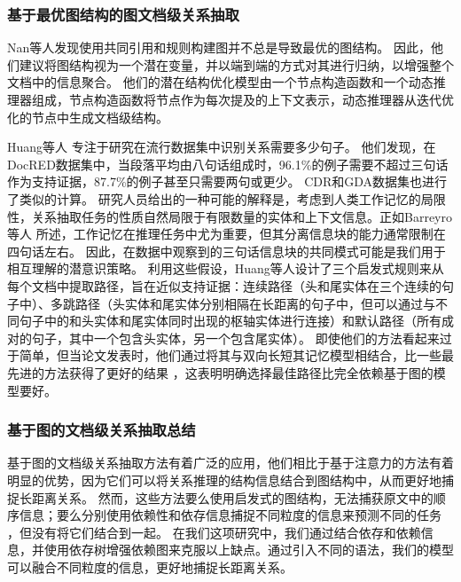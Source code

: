 \documentclass[bachelor]{thesis-uestc}
\begin{document}
\subsubsection{基于最优图结构的图文档级关系抽取}\label{subsec:optimal-graph}

Nan等人\cite{nan-etal-2020-reasoning}发现使用共同引用和规则构建图并不总是导致最优的图结构。
因此，他们建议将图结构视为一个潜在变量，并以端到端的方式对其进行归纳，以增强整个文档中的信息聚合。
他们的潜在结构优化模型由一个节点构造函数和一个动态推理器组成，节点构造函数将节点作为每次提及的上下文表示，动态推理器从迭代优化的节点中生成文档级结构。\par

Huang等人 \cite{huang-etal-2021-three}专注于研究在流行数据集中识别关系需要多少句子。
他们发现，在DocRED数据集中，当段落平均由八句话组成时，96.1\%的例子需要不超过三句话作为支持证据，87.7\%的例子甚至只需要两句或更少。
CDR和GDA数据集也进行了类似的计算。
研究人员给出的一种可能的解释是，考虑到人类工作记忆的局限性，关系抽取任务的性质自然局限于有限数量的实体和上下文信息。正如Barreyro等人 \cite{barreyro2012working} 所述，工作记忆在推理任务中尤为重要，但其分离信息块的能力通常限制在四句话左右。
因此，在数据中观察到的三句话信息块的共同模式可能是我们用于相互理解的潜意识策略。
利用这些假设，Huang等人设计了三个启发式规则来从每个文档中提取路径，旨在近似支持证据：连续路径（头和尾实体在三个连续的句子中）、多跳路径（头实体和尾实体分别相隔在长距离的句子中，但可以通过与不同句子中的和头实体和尾实体同时出现的枢轴实体进行连接）和默认路径（所有成对的句子，其中一个包含头实体，另一个包含尾实体）。
即使他们的方法看起来过于简单，但当论文发表时，他们通过将其与双向长短其记忆模型相结合，比一些最先进的方法获得了更好的结果 \cite{nan-etal-2020-reasoning,GAIN}，这表明明确选择最佳路径比完全依赖基于图的模型要好。\par

\subsubsection{基于图的文档级关系抽取总结}\label{subsec:graph-neural-network}

基于图的文档级关系抽取方法有着广泛的应用，他们相比于基于注意力的方法有着明显的优势，因为它们可以将关系推理的结构信息结合到图结构中，从而更好地捕捉长距离关系。
然而，这些方法要么使用启发式的图结构，无法捕获原文中的顺序信息\cite{GAIN, Xu2020DocumentLevelRE}；要么分别使用依赖性和依存信息捕捉不同粒度的信息来预测不同的任务 \cite{SagDRE, duan-etal-2022-just}，但没有将它们结合到一起。
在我们这项研究中，我们通过结合依存和依赖信息，并使用依存树增强依赖图来克服以上缺点。通过引入不同的语法，我们的模型可以融合不同粒度的信息，更好地捕捉长距离关系。
\end{document}
